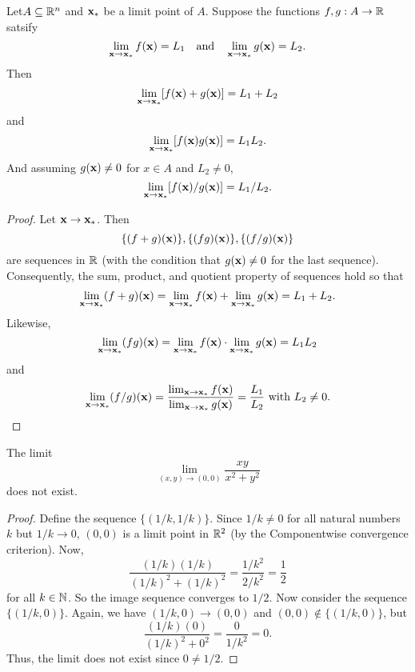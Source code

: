 \documentclass[letterpaper, twoside, 12pt]{book}
\begin{document}
\begin{theorem}[13.3]
  Let\(A\subseteq\mathbb R^n\) and \(\mathbf x_*\) be a limit point of \(A\).
  Suppose the functions \(f,g:A\to\mathbb R\) satsify
  \[
    \lim_{\mathbf x\to\mathbf x_*} f(\mathbf x)
      =
    L_1
    ~~~\text{and}~~~
    \lim_{\mathbf x\to\mathbf x_*} g(\mathbf x)
      =
    L_2
  .\]
  Then
  \[
    \lim_{\mathbf x\to\mathbf x_*} [f(\mathbf x)+g(\mathbf x)]
      =
    L_1+L_2
  \]
  and
  \[
    \lim_{\mathbf x\to\mathbf x_*} [f(\mathbf x)g(\mathbf x)]
      =
    L_1L_2
  .\]
  And assuming \(g(\mathbf x)\not=0\) for \(x\in A\) and \(L_2\not=0\),
  \[
    \lim_{\mathbf x\to\mathbf x_*} [f(\mathbf x)/g(\mathbf x)]
      =
    L_1/L_2
  .\]
\end{theorem}

\begin{proof}
    Let \(\mathbf x \to \mathbf x_*\). Then 
    \[ \{(f + g)(\mathbf x)\}, \{(fg)(\mathbf x)\}, \{(f/g)(\mathbf x)\} \]
    are sequences in \(\mathbb R\) (with the condition that \(g(\mathbf x) \neq 0\)
    for the last sequence). Consequently, the sum, product, and
    quotient property of sequences hold so that
    \[ \lim_{\mathbf x \to \mathbf x_*} (f + g)(\mathbf x) = 
       \lim_{\mathbf x \to \mathbf x_*} f(\mathbf x) + 
       \lim_{\mathbf x \to \mathbf x_*} g(\mathbf x) = L_1 + L_2 .\]
    Likewise,
    \[ \lim_{\mathbf x \to \mathbf x_*} (fg)(\mathbf x) =
       \lim_{\mathbf x \to \mathbf x_*} f(\mathbf x) \cdot 
       \lim_{\mathbf x \to \mathbf x_*} g(\mathbf x) = L_1 L_2 \]
    and 
    \[ \lim_{\mathbf x \to \mathbf x_*} (f/g)(\mathbf x) =
        \frac{\lim_{\mathbf x \to \mathbf x_*} f(\mathbf x)}{\lim_{\mathbf x \to \mathbf x_*} g(\mathbf x)} =
    \frac{L_1}{L_2}  \text{~with~} L_2 \neq 0 .\]
\end{proof}

\begin{example}[13.4]
  The limit
  \[
    \lim_{(x,y)\to(0,0)}\frac{xy}{x^2+y^2}
  \]
  does not exist.
\end{example}

\begin{proof}
    Define the sequence \(\{(1/k , 1/k)\}\). Since \(1/k \neq 0\) for
    all natural numbers \(k\) but \(1/k \to 0\), \((0,0)\) is a limit point in
    \(\mathbb R^2\) (by the Componentwise convergence criterion).
    Now,
    \[ \frac{(1/k)(1/k)}{ (1/k)^2 + (1/k)^2} = \frac{ 1/k^2}{2/k^2} = \frac{1}{2} \]
    for all \(k \in \mathbb N\). So the image sequence converges to \(1/2\). Now consider
    the sequence \( \{ (1/k, 0) \}\). Again, we have \( (1/k, 0) \to (0,0)\) and 
    \((0,0) \not\in \{(1/k, 0)\}\), but 
    \[ \frac{(1/k)(0)}{(1/k)^2 + 0^2} = \frac{0}{1/k^2} = 0 .\]
    Thus, the limit does not exist since \(0 \neq 1/2\).
\end{proof}
\end{document}
